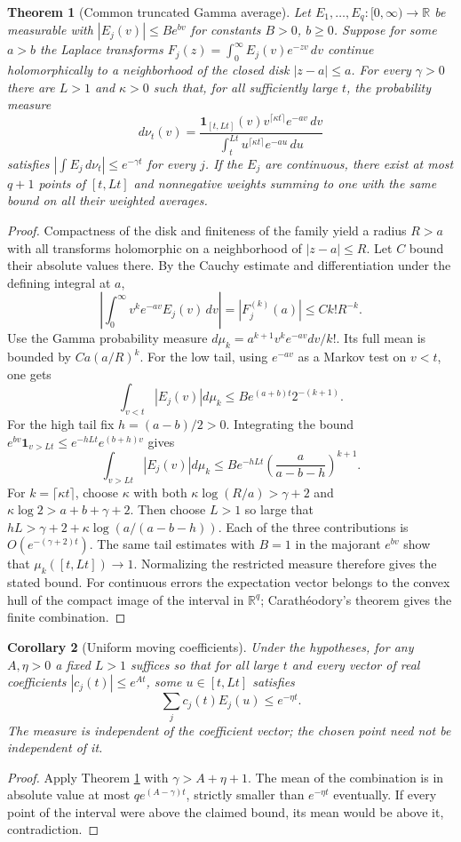 \documentclass[11pt]{article}
\newtheorem{theorem}{Theorem}[section]
\newtheorem{corollary}[theorem]{Corollary}
\theoremstyle{remark}\newtheorem{remark}[theorem]{Remark}
\newcommand{\one}{\mathbf 1}
\begin{document}
\begin{theorem}[Common truncated Gamma average]\label{thm:window}
Let $E_1,\ldots,E_q:[0,\infty)\to\mathbb R$ be measurable with
$|E_j(v)|\le B e^{bv}$ for constants $B>0$, $b\ge0$.
Suppose for some $a>b$ the Laplace transforms
$F_j(z)=\int_0^\infty E_j(v)e^{-zv}\,dv$ continue holomorphically
to a neighborhood of the closed disk $|z-a|\le a$.
For every $\gamma>0$ there are $L>1$ and $\kappa>0$ such that, for
all sufficiently large $t$, the probability measure
\[
 d\nu_t(v)=\frac{\one_{[t,Lt]}(v)v^{\lceil\kappa t\rceil}e^{-av}\,dv}
 {\int_t^{Lt} u^{\lceil\kappa t\rceil}e^{-au}\,du}
\]
satisfies $|\int E_j\,d\nu_t|\le e^{-\gamma t}$ for every $j$.
If the $E_j$ are continuous, there exist at most $q+1$ points of
$[t,Lt]$ and nonnegative weights summing to one with the same bound
on all their weighted averages.
\end{theorem}
\begin{proof}
Compactness of the disk and finiteness of the family yield a radius
$R>a$ with all transforms holomorphic on a neighborhood of
$|z-a|\le R$. Let $C$ bound their absolute values there. By the Cauchy
estimate and differentiation under the defining integral at $a$,
\[
 \left|\int_0^\infty v^k e^{-av}E_j(v)\,dv\right|
 =|F_j^{(k)}(a)|\le C k! R^{-k}.
\]
Use the Gamma probability measure $d\mu_k=a^{k+1}v^k e^{-av}dv/k!$.
Its full mean is bounded by $Ca(a/R)^k$. For the low tail, using
$e^{-av}$ as a Markov test on $v<t$, one gets
\[
 \int_{v<t}|E_j(v)|d\mu_k\le B e^{(a+b)t}2^{-(k+1)}.
\]
For the high tail fix $h=(a-b)/2>0$. Integrating the bound
$e^{bv}\one_{v>Lt}\le e^{-hLt}e^{(b+h)v}$ gives
\[
 \int_{v>Lt}|E_j(v)|d\mu_k\le B e^{-hLt}
        \left(\frac a{a-b-h}\right)^{k+1}.
\]
For $k=\lceil\kappa t\rceil$, choose $\kappa$ with both
$\kappa\log(R/a)>\gamma+2$ and
$\kappa\log2>a+b+\gamma+2$. Then choose $L>1$ so large that
$hL>\gamma+2+\kappa\log(a/(a-b-h))$. Each of the three contributions
is $O(e^{-(\gamma+2)t})$. The same tail estimates with $B=1$ in the
majorant $e^{bv}$ show that $\mu_k([t,Lt])\to1$. Normalizing the
restricted measure therefore gives the stated bound. For continuous
errors the expectation vector belongs to the convex hull of the
compact image of the interval in $\mathbb R^q$; Carath\'eodory's theorem
gives the finite combination.
\end{proof}

\begin{corollary}[Uniform moving coefficients]\label{cor:window}
Under the hypotheses, for any $A,\eta>0$ a fixed $L>1$ suffices so
that for all large $t$ and every vector of real coefficients
$|c_j(t)|\le e^{At}$, some $u\in[t,Lt]$ satisfies
\[
 \sum_j c_j(t)E_j(u)\le e^{-\eta t}.
\]
The measure is independent of the coefficient vector; the chosen
point need not be independent of it.
\end{corollary}
\begin{proof}
Apply Theorem \ref{thm:window} with $\gamma>A+\eta+1$. The mean of
the combination is in absolute value at most $qe^{(A-\gamma)t}$,
strictly smaller than $e^{-\eta t}$ eventually. If every point of
the interval were above the claimed bound, its mean would be above
it, contradiction.
\end{proof}
\end{document}
